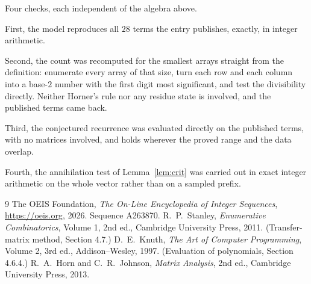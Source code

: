 \documentclass[11pt,a4paper]{article}
\theoremstyle{plain}
\theoremstyle{definition}
\begin{document}
Four checks, each independent of the algebra above.

First, the model reproduces all $28$ terms the entry publishes, exactly, in integer
arithmetic.

Second, the count was recomputed for the smallest arrays straight from the definition:
enumerate every array of that size, turn each row and each column into a base-$2$ number with
the first digit most significant, and test the divisibility directly. Neither Horner's rule nor
any residue state is involved, and the published terms came back.

Third, the conjectured recurrence was evaluated directly on the published terms, with no
matrices involved, and holds wherever the proved range and the data overlap.

Fourth, the annihilation test of Lemma~\ref{lem:crit} was carried out in exact integer
arithmetic on the whole vector rather than on a sampled prefix.

\begin{thebibliography}{9}
 The OEIS Foundation, \emph{The On-Line Encyclopedia of Integer
Sequences}, \url{https://oeis.org}, 2026. Sequence A263870.
 R.~P.~Stanley, \emph{Enumerative Combinatorics}, Volume 1, 2nd ed.,
Cambridge University Press, 2011. (Transfer-matrix method, Section 4.7.)
 D.~E.~Knuth, \emph{The Art of Computer Programming}, Volume 2, 3rd ed.,
Addison--Wesley, 1997. (Evaluation of polynomials, Section 4.6.4.)
 R.~A.~Horn and C.~R.~Johnson, \emph{Matrix Analysis}, 2nd ed., Cambridge
University Press, 2013.
\end{thebibliography}
\end{document}
